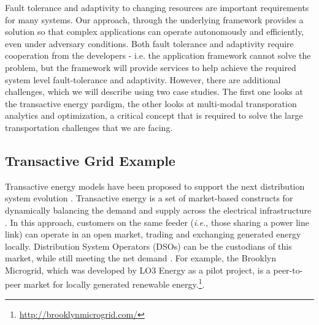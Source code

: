 \documentclass[12pt,letterpaper]{article}
\begin{document}
Fault tolerance and adaptivity to changing resources are important requirements for many systems. Our approach, through the underlying framework provides a solution so that complex applications can operate autonomously and efficiently, even under adversary conditions. Both fault tolerance and adaptivity require cooperation from the developers - i.e. the application framework cannot solve the problem, but the framework will provide services to help achieve the required system level fault-tolerance and adaptivity.  However, there are additional challenges, which we will describe using two case studies. The first one looks at the transactive energy pardigm, the other looks at multi-modal transporation analytics and optimization, a critical concept that is required to solve the large transportation challenges that we are facing. 

\subsection{Transactive Grid Example}

Transactive energy models have
been proposed to support the next distribution system evolution
\cite{kok2016society,cox2013structured,melton2013gridwise}. Transactive
energy is a set of market-based constructs for dynamically balancing
the demand and supply across the electrical infrastructure
\cite{melton2013gridwise}. In this approach, customers on the same
feeder (\emph{i.e.}, those sharing a power line link) can operate in an
open market, trading and exchanging generated energy
locally. Distribution System Operators (DSOs) can be the custodians of
this market, while still meeting the net demand \cite{7462854}. For
example, the Brooklyn Microgrid, which was developed by LO3 Energy as
a pilot project, is a peer-to-peer market for locally generated
renewable energy.\footnote{\url{http://brooklynmicrogrid.com/}}.
\end{document}
